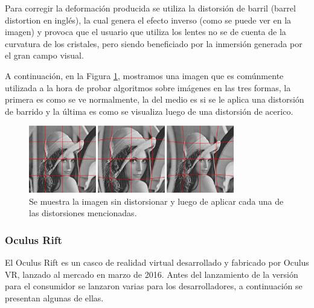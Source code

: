\documentclass[12pt]{article}
\begin{document}
Para corregir la deformación producida se utiliza la distorsión de barril (barrel distortion en inglés), la cual genera el efecto inverso (como se puede ver en la imagen) y provoca que el usuario que utiliza los lentes no se de cuenta de la curvatura de los cristales, pero siendo beneficiado por la inmersión generada por el gran campo visual\cite{oculusrendering}. 

A continuación, en la Figura \ref{lenna}, mostramos una imagen que es comúnmente utilizada a la hora de probar algoritmos sobre imágenes en las tres formas, la primera es como se ve normalmente, la del medio es si se le aplica una distorsión de barrido y la última es como se visualiza luego de una distorsión de acerico.
\begin{figure}[h!]
\includegraphics[width=0.8\textwidth, center]{imagen_clasica.png}
\caption{Se muestra la imagen sin distorsionar y luego de aplicar cada una de las distorsiones mencionadas.}
\label{lenna}
\end{figure}

\subsubsection{ Oculus Rift}
\noindent El Oculus Rift es un casco de realidad virtual desarrollado y fabricado por Oculus VR, lanzado al mercado en marzo de 2016. Antes del lanzamiento de la versión para el consumidor se lanzaron varias para los desarrolladores, a continuación se presentan algunas de ellas\cite{oculus}.
\end{document}
